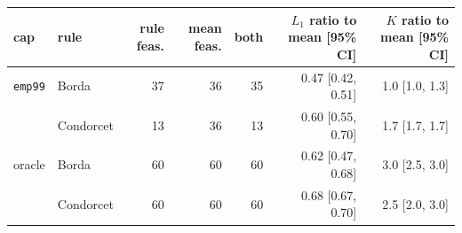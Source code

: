 \begingroup\footnotesize\setlength{\tabcolsep}{3pt}
\begin{tabular}{@{}llrrrrr@{}}
\toprule
cap & rule & rule feas. & mean feas. & both & $L_1$ ratio to mean [95\% CI] & $K$ ratio to mean [95\% CI] \\
\midrule
\texttt{emp99} & Borda & 37 & 36 & 35 & 0.47 [0.42, 0.51] & 1.0 [1.0, 1.3] \\
 & Condorcet & 13 & 36 & 13 & 0.60 [0.55, 0.70] & 1.7 [1.7, 1.7] \\
\addlinespace[2pt]
oracle & Borda & 60 & 60 & 60 & 0.62 [0.47, 0.68] & 3.0 [2.5, 3.0] \\
 & Condorcet & 60 & 60 & 60 & 0.68 [0.67, 0.70] & 2.5 [2.0, 3.0] \\
\bottomrule
\end{tabular}\endgroup
